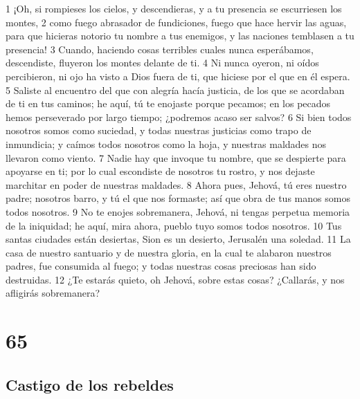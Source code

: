 1 ¡Oh, si rompieses los cielos, y descendieras, y a tu presencia se escurriesen los montes,
2 como fuego abrasador de fundiciones, fuego que hace hervir las aguas, para que hicieras notorio tu nombre a tus enemigos, y las naciones temblasen a tu presencia!
3 Cuando, haciendo cosas terribles cuales nunca esperábamos, descendiste, fluyeron los montes delante de ti.
4 Ni nunca oyeron, ni oídos percibieron, ni ojo ha visto a Dios fuera de ti, que hiciese por el que en él espera. 
5 Saliste al encuentro del que con alegría hacía justicia, de los que se acordaban de ti en tus caminos; he aquí, tú te enojaste porque pecamos; en los pecados hemos perseverado por largo tiempo; ¿podremos acaso ser salvos?
6 Si bien todos nosotros somos como suciedad, y todas nuestras justicias como trapo de inmundicia; y caímos todos nosotros como la hoja, y nuestras maldades nos llevaron como viento.
7 Nadie hay que invoque tu nombre, que se despierte para apoyarse en ti; por lo cual escondiste de nosotros tu rostro, y nos dejaste marchitar en poder de nuestras maldades.
8 Ahora pues, Jehová, tú eres nuestro padre; nosotros barro, y tú el que nos formaste; así que obra de tus manos somos todos nosotros.
9 No te enojes sobremanera, Jehová, ni tengas perpetua memoria de la iniquidad; he aquí, mira ahora, pueblo tuyo somos todos nosotros.
10 Tus santas ciudades están desiertas, Sion es un desierto, Jerusalén una soledad.
11 La casa de nuestro santuario y de nuestra gloria, en la cual te alabaron nuestros padres, fue consumida al fuego; y todas nuestras cosas preciosas han sido destruidas.
12 ¿Te estarás quieto, oh Jehová, sobre estas cosas? ¿Callarás, y nos afligirás sobremanera?

\chapter{65}

\section*{Castigo de los rebeldes}

